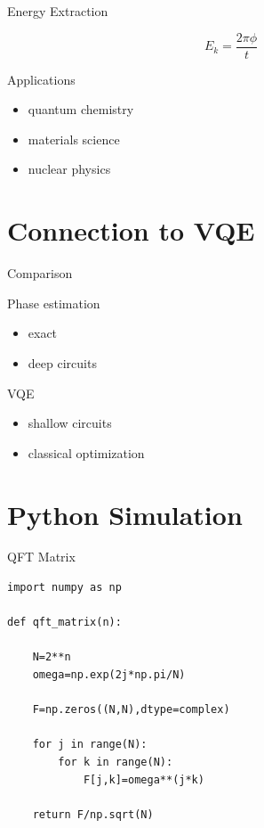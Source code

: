 \documentclass{beamer}
\begin{document}

\begin{frame}{Energy Extraction}

\[
E_k =
\frac{2\pi\phi}{t}
\]

\end{frame}


\begin{frame}{Applications}

\begin{itemize}
\item quantum chemistry
\item materials science
\item nuclear physics
\end{itemize}

\end{frame}

\section{Connection to VQE}

\begin{frame}{Comparison}

Phase estimation

\begin{itemize}
\item exact
\item deep circuits
\end{itemize}

VQE

\begin{itemize}
\item shallow circuits
\item classical optimization
\end{itemize}

\end{frame}

\section{Python Simulation}

\begin{frame}[fragile]{QFT Matrix}

\begin{lstlisting}
import numpy as np

def qft_matrix(n):

    N=2**n
    omega=np.exp(2j*np.pi/N)

    F=np.zeros((N,N),dtype=complex)

    for j in range(N):
        for k in range(N):
            F[j,k]=omega**(j*k)

    return F/np.sqrt(N)
\end{lstlisting}

\end{frame}
\end{document}
